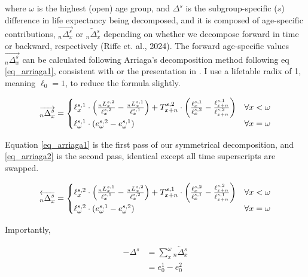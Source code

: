 \documentclass[sn-apa,pdflatex]{sn-jnl}
\theoremstyle{remark}
\theoremstyle{definition}
\begin{document}
\noindent where \(\omega\) is the highest (open) age group, and
\(\Delta^s\) is the subgroup-specific (\(s\)) difference in life
expectancy being decomposed, and it is composed of age-specific
contributions, \(\overrightarrow{{}_n\Delta_x^s}\) or
\(\overleftarrow{{}_n\Delta_x^s}\) depending on whether we decompose
forward in time or backward, respectively (Riffe et. al., 2024). The
forward age-specific values \(\overrightarrow{{}_n\Delta_x^s}\) can be
calculated following Arriaga's decomposition method following eq
\eqref{eq_arriaga1}, consistent with \citet{arriaga1984measuring} or the
presentation in \citet{preston2000demography}. I use a lifetable radix
of 1, meaning \(\ell_0 = 1\), to reduce the formula slightly.

\begin{equation}
\label{eq_arriaga1}
 \overrightarrow{{}_n\Delta_x^s} = \begin{cases}\ell_x^{s,1} \cdot \left( \frac{{}_nL_x^{s,2}}{\ell_x^{s,2}} - \frac{{}_nL_x^{s,1}}{\ell_x^{s,1}}\right)+T_{x+n}^{s,2}\cdot\left(\frac{\ell_x^{s,1}}{\ell_x^{s,2}} - \frac{\ell_{x+n}^{s,1}}{\ell_{x+n}^{s,2}}\right)  & \text{$ \forall x < \omega$}  \\
  \ell_\omega ^{s,1} \cdot (e_\omega^{s,2} -e_\omega^{s,1} ) & \text{$\forall x = \omega $}
  \end{cases}
\end{equation}

Equation \eqref{eq_arriaga1} is the first pass of our symmetrical
decomposition, and \eqref{eq_arriaga2} is the second pass, identical
except all time superscripts are swapped.

\begin{equation}
\label{eq_arriaga2}
 \overleftarrow{{}_n\Delta_x^s} = \begin{cases}\ell_x^{s,2} \cdot \left( \frac{{}_nL_x^{s,1}}{\ell_x^{s,1}} - \frac{{}_nL_x^{s,2}}{\ell_x^{s,2}}\right)+T_{x+n}^{s,1}\cdot\left(\frac{\ell_x^{s,2}}{\ell_x^{s,1}} - \frac{\ell_{x+n}^{s,2}}{\ell_{x+n}^{s,1}}\right)  & \text{$ \forall x < \omega$}  \\
  \ell_\omega ^{s,2} \cdot (e_\omega^{s,1} -e_\omega^{s,2} ) & \text{$\forall x = \omega $}
  \end{cases}
\end{equation}

Importantly,

\begin{align}
\label{eq_sum2}
 -\Delta^s &= \sum_x^\omega \overleftarrow{{}_n\Delta_x^s} \\
 &= e_0^1 - e_0^2 \nonumber
\end{align}
\end{document}
